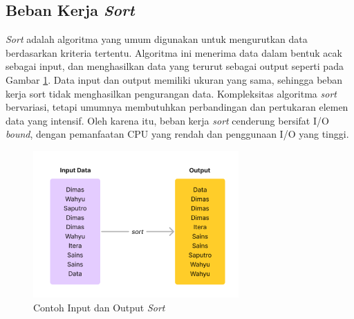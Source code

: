 \subsection{Beban Kerja \textit{Sort}}
\textit{Sort} adalah algoritma yang umum digunakan untuk mengurutkan data berdasarkan kriteria tertentu. Algoritma ini menerima data dalam bentuk acak sebagai input, dan menghasilkan data yang terurut sebagai output seperti pada Gambar \ref{fig:sample-sort}. Data input dan output memiliki ukuran yang sama, sehingga beban kerja sort tidak menghasilkan pengurangan data.
Kompleksitas algoritma \textit{sort} bervariasi, tetapi umumnya membutuhkan perbandingan dan pertukaran elemen data yang intensif. Oleh karena itu, beban kerja \textit{sort} cenderung bersifat I/O \textit{bound}, dengan pemanfaatan CPU yang rendah dan penggunaan I/O yang tinggi. 

\begin{figure}[h]
    \centering
    \includegraphics[width=0.7\textwidth]{figures/ch02/sample-sort}
    \caption{Contoh Input dan Output \textit{Sort}}
    \label{fig:sample-sort}
\end{figure}

